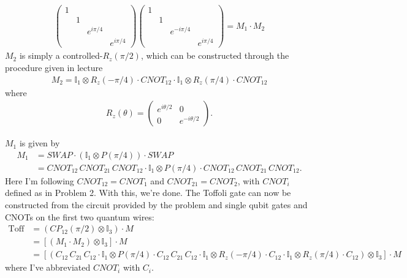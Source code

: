 \documentclass{article}
\theoremstyle{definition}
\begin{document}
\begin{enumerate}[label=(\alph*)]
\begin{align*}
\begin{pmatrix}
		1&&&\\
		&1&&\\
		&&e^{i\pi/4}&\\
		&&&e^{i\pi/4}
	\end{pmatrix}
\begin{pmatrix}
	1&&&\\
	&1&&\\
	&&e^{-i\pi/4}&\\
	&&&e^{i\pi/4}
\end{pmatrix} = M_1 \cdot M_2
\end{align*}
$M_2$ is simply a controlled-$R_z(\pi/2)$, which can be constructed through the procedure given in lecture
\begin{align*}
	M_2 = \mathbb{I}_1\otimes R_z(-\pi/4) \cdot CNOT_{12} \cdot \mathbb{I}_1\otimes R_z(\pi/4) \cdot CNOT_{12}
\end{align*}
where
\begin{align*}
	R_z(\theta) = \begin{pmatrix}
		e^{i\theta/2} & 0 \\ 0 & e^{-i\theta/2}
	\end{pmatrix}.
\end{align*}

$M_1$ is given by 
\begin{align*}
	M_1 &= SWAP \cdot (\mathbb{I}_1\otimes P(\pi/4)) \cdot SWAP \\
	&= CNOT_{12}\,CNOT_{21}\, CNOT_{12} \cdot \mathbb{I}_1\otimes P(\pi/4) \cdot CNOT_{12}\, CNOT_{21}\, CNOT_{12}.
\end{align*}
Here I'm following $CNOT_{12} = CNOT_1$ and $CNOT_{21} = CNOT_2$, with $CNOT_i$ defined as in Problem 2. With this, we're done. The Toffoli gate can now be constructed from the circuit provided by the problem and single qubit gates and CNOTs on the first two quantum wires:
\begin{align*}
	\text{Toff} 
	&= ( CP_{12}(\pi/2) \otimes \mathbb{I}_3) \cdot M \\
	&=   [ (M_1\cdot M_2) \otimes \mathbb{I}_3] \cdot M \\
	&=  [ (C_{12}\,C_{21}\, C_{12} \cdot \mathbb{I}_1\otimes P(\pi/4) \cdot C_{12}\, C_{21}\, C_{12}\cdot \mathbb{I}_1\otimes R_z(-\pi/4) \cdot C_{12} \cdot \mathbb{I}_1\otimes R_z(\pi/4)\cdot C_{12} ) \otimes \mathbb{I}_3] \cdot M
\end{align*}
where I've abbreviated $CNOT_i$ with $C_i$.\\



\end{enumerate}
\end{document}
